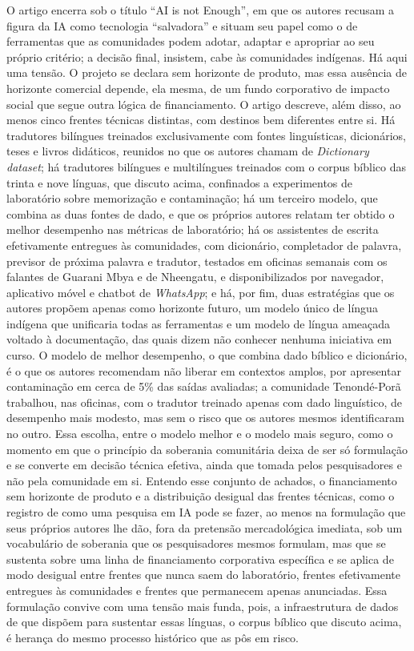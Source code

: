 O artigo encerra sob o título \enquote{AI is not Enough}, em que os autores recusam a figura da IA como tecnologia \enquote{salvadora} e situam seu papel como o de ferramentas que as comunidades podem adotar, adaptar e apropriar ao seu próprio critério; a decisão final, insistem, cabe às comunidades indígenas. Há aqui uma tensão. O projeto se declara sem horizonte de produto, mas essa ausência de horizonte comercial depende, ela mesma, de um fundo corporativo de impacto social que segue outra lógica de financiamento. O artigo descreve, além disso, ao menos cinco frentes técnicas distintas, com destinos bem diferentes entre si. Há tradutores bilíngues treinados exclusivamente com fontes linguísticas, dicionários, teses e livros didáticos, reunidos no que os autores chamam de \textit{Dictionary dataset}; há tradutores bilíngues e multilíngues treinados com o corpus bíblico das trinta e nove línguas, que discuto acima, confinados a experimentos de laboratório sobre memorização e contaminação; há um terceiro modelo, que combina as duas fontes de dado, e que os próprios autores relatam ter obtido o melhor desempenho nas métricas de laboratório; há os assistentes de escrita efetivamente entregues às comunidades, com dicionário, completador de palavra, previsor de próxima palavra e tradutor, testados em oficinas semanais com os falantes de Guarani Mbya e de Nheengatu, e disponibilizados por navegador, aplicativo móvel e chatbot de \textit{WhatsApp}; e há, por fim, duas estratégias que os autores propõem apenas como horizonte futuro, um modelo único de língua indígena que unificaria todas as ferramentas e um modelo de língua ameaçada voltado à documentação, das quais dizem não conhecer nenhuma iniciativa em curso. O modelo de melhor desempenho, o que combina dado bíblico e dicionário, é o que os autores recomendam não liberar em contextos amplos, por apresentar contaminação em cerca de 5\% das saídas avaliadas; a comunidade Tenondé-Porã trabalhou, nas oficinas, com o tradutor treinado apenas com dado linguístico, de desempenho mais modesto, mas sem o risco que os autores mesmos identificaram no outro. Essa escolha, entre o modelo melhor e o modelo mais seguro, como o momento em que o princípio da soberania comunitária deixa de ser só formulação e se converte em decisão técnica efetiva, ainda que tomada pelos pesquisadores e não pela comunidade em si. Entendo esse conjunto de achados, o financiamento sem horizonte de produto e a distribuição desigual das frentes técnicas, como o registro de como uma pesquisa em IA pode se fazer, ao menos na formulação que seus próprios autores lhe dão, fora da pretensão mercadológica imediata, sob um vocabulário de soberania que os pesquisadores mesmos formulam, mas que se sustenta sobre uma linha de financiamento corporativa específica e se aplica de modo desigual entre frentes que nunca saem do laboratório, frentes efetivamente entregues às comunidades e frentes que permanecem apenas anunciadas. Essa formulação convive com uma tensão mais funda, pois, a infraestrutura de dados de que dispõem para sustentar essas línguas, o corpus bíblico que discuto acima, é herança do mesmo processo histórico que as pôs em risco. 

